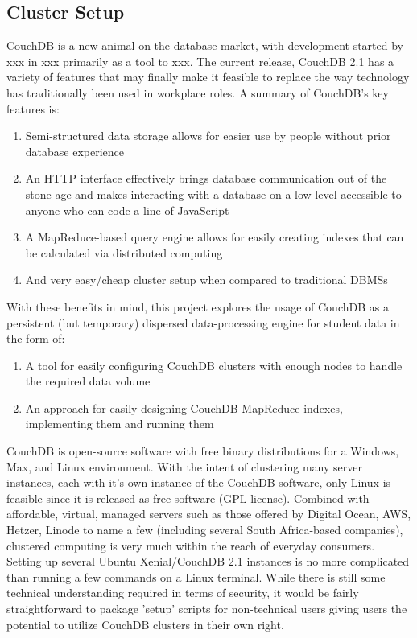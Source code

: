 \subsection{Cluster Setup}
CouchDB is a new animal on the database market, with development started by xxx in xxx primarily as a tool to xxx. The current release, CouchDB 2.1 has a variety of features that may finally make it feasible to replace the way technology has traditionally been used in workplace roles. A summary of CouchDB's key features is:

\begin{enumerate}
    \item Semi-structured data storage allows for easier use by people without prior database experience
    \item An HTTP interface effectively brings database communication out of the stone age and makes interacting with a database on a low level accessible to anyone who can code a line of JavaScript
    \item A MapReduce-based query engine allows for easily creating indexes that can be calculated via distributed computing
    \item And very easy/cheap cluster setup when compared to traditional DBMSs
\end{enumerate}

With these benefits in mind, this project explores the usage of CouchDB as a persistent (but temporary) dispersed data-processing engine for student data in the form of:

\begin{enumerate}
    \item A tool for easily configuring CouchDB clusters with enough nodes to handle the required data volume
    \item An approach for easily designing CouchDB MapReduce indexes, implementing them and running them
\end{enumerate}

CouchDB is open-source software with free binary distributions for a Windows, Max, and Linux environment. With the intent of clustering many server instances, each with it's own instance of the CouchDB software, only Linux is feasible since it is released as free software (GPL license). Combined with affordable, virtual, managed servers such as those offered by Digital Ocean, AWS, Hetzer, Linode to name a few (including several South Africa-based companies), clustered computing is very much within the reach of everyday consumers. Setting up several Ubuntu Xenial/CouchDB 2.1 instances is no more complicated than running a few commands on a Linux terminal. While there is still some technical understanding required in terms of security, it would be fairly straightforward to package 'setup' scripts for non-technical users giving users the potential to utilize CouchDB clusters in their own right.

